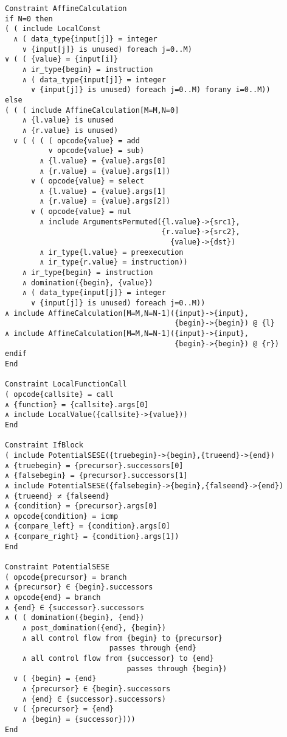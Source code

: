 \begin{lstlisting}
Constraint AffineCalculation
if N=0 then
( ( include LocalConst
  ∧ ( data_type{input[j]} = integer
    ∨ {input[j]} is unused) foreach j=0..M)
∨ ( ( {value} = {input[i]}
    ∧ ir_type{begin} = instruction
    ∧ ( data_type{input[j]} = integer
      ∨ {input[j]} is unused) foreach j=0..M) forany i=0..M))
else
( ( ( include AffineCalculation[M=M,N=0]
    ∧ {l.value} is unused
    ∧ {r.value} is unused)
  ∨ ( ( ( ( opcode{value} = add
          ∨ opcode{value} = sub)
        ∧ {l.value} = {value}.args[0]
        ∧ {r.value} = {value}.args[1])
      ∨ ( opcode{value} = select
        ∧ {l.value} = {value}.args[1]
        ∧ {r.value} = {value}.args[2])
      ∨ ( opcode{value} = mul
        ∧ include ArgumentsPermuted({l.value}->{src1},
                                    {r.value}->{src2},
                                      {value}->{dst})
        ∧ ir_type{l.value} = preexecution
        ∧ ir_type{r.value} = instruction))
    ∧ ir_type{begin} = instruction
    ∧ domination({begin}, {value})
    ∧ ( data_type{input[j]} = integer
      ∨ {input[j]} is unused) foreach j=0..M))
∧ include AffineCalculation[M=M,N=N-1]({input}->{input},
                                       {begin}->{begin}) @ {l}
∧ include AffineCalculation[M=M,N=N-1]({input}->{input},
                                       {begin}->{begin}) @ {r})
endif
End

Constraint LocalFunctionCall
( opcode{callsite} = call
∧ {function} = {callsite}.args[0]
∧ include LocalValue({callsite}->{value}))
End

Constraint IfBlock
( include PotentialSESE({truebegin}->{begin},{trueend}->{end})
∧ {truebegin} = {precursor}.successors[0]
∧ {falsebegin} = {precursor}.successors[1]
∧ include PotentialSESE({falsebegin}->{begin},{falseend}->{end})
∧ {trueend} ≠ {falseend}
∧ {condition} = {precursor}.args[0]
∧ opcode{condition} = icmp
∧ {compare_left} = {condition}.args[0]
∧ {compare_right} = {condition}.args[1])
End

Constraint PotentialSESE
( opcode{precursor} = branch
∧ {precursor} ∈ {begin}.successors
∧ opcode{end} = branch
∧ {end} ∈ {successor}.successors
∧ ( ( domination({begin}, {end})
    ∧ post_domination({end}, {begin})
    ∧ all control flow from {begin} to {precursor}
                        passes through {end}
    ∧ all control flow from {successor} to {end}
                            passes through {begin})
  ∨ ( {begin} = {end}
    ∧ {precursor} ∈ {begin}.successors
    ∧ {end} ∈ {successor}.successors)
  ∨ ( {precursor} = {end}
    ∧ {begin} = {successor})))
End


\end{lstlisting}
